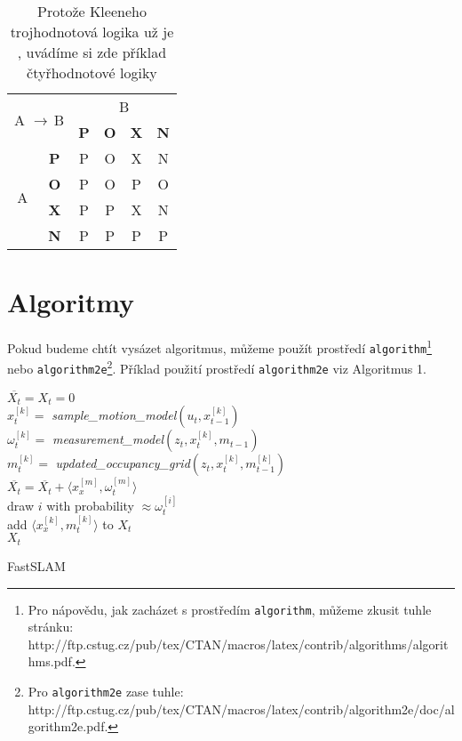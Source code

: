 \documentclass[a4paper, 11pt]{article}
\begin{document}
\begin{table}[h]
\begin{center}
        \begin{tabular}{|c|c|c|c|c|c|}
            \hline
            \multicolumn{2}{|c|}{\multirow{2}{*}{A $\rightarrow$\,B}} & \multicolumn{4}{c|}{B} \\
            \cline{3-6}
            \multicolumn{2}{|c|}{} & \textbf{P} & \textbf{O} & \textbf{X} & \textbf{N}\\
            \hline
                & \textbf{P} & P & O & X & N \\
            \cline{2-6} 
            \multirow{2}{*}{A} & \textbf{O} & P & O & P & O \\
            \cline{2-6} 
                & \textbf{X} & P & P & X & N \\
            \cline{2-6} 
            \multicolumn{1}{|l|}{} & \textbf{N} & P & P & P & P \\
            \hline
        \end{tabular}
        \caption{Protože Kleeneho trojhodnotová logika už je , uvádíme si zde příklad čtyřhodnotové logiky}
\end{center}
\end{table}

\pagebreak

\section{Algoritmy}
Pokud budeme chtít vysázet algoritmus, můžeme použít prostředí \verb!algorithm!\footnote{Pro nápovědu, jak zacházet s prostředím \texttt{algorithm}, můžeme zkusit tuhle stránku: \hfill \break
http://ftp.cstug.cz/pub/tex/CTAN/macros/latex/contrib/algorithms/algorithms.pdf.} nebo \verb!algorithm2e!\footnote{Pro \texttt{algorithm2e} zase tuhle: http://ftp.cstug.cz/pub/tex/CTAN/macros/latex/contrib/algorithm2e/doc/algorithm2e.pdf.}.
Příklad použití prostředí \verb!algorithm2e! viz Algoritmus 1.


\begin{algorithm}
    \SetNlSty{}{}{:}
    \SetNlSkip{-1.15em}
    \Indp\Indpp
    $\overline{X_t} = X_t = 0$\\
    {
        $x_{t}^{[k]} =$ \emph{sample\_motion\_model}$(u_{t}, x_{t-1}^{[k]})$\\
        $\omega_{t}^{[k]} =$ \emph{measurement\_model}$(z_{t}, x_{t}^{[k]}, m_{t-1})$\\
        $m_{t}^{[k]} =$ \emph{updated\_occupancy\_grid}$(z_t, x_{t}^{[k]}, m_{t-1}^{[k]})$\\
        $\overline{X_{t}} = \overline{X_{t}} + \langle x_{x}^{[m]}, \omega^{[m]}_{t} \rangle$\\
    }
    {
        draw $i$ with probability $\approx \omega^{[i]}_{t}$\\
        add $\langle x^{[k]}_{x}, m^{[k]}_{t} \rangle$ to $X_{t}$\\
    }
    \KwRet $X_t$
    \caption{FastSLAM}
\end{algorithm}
\end{document}
